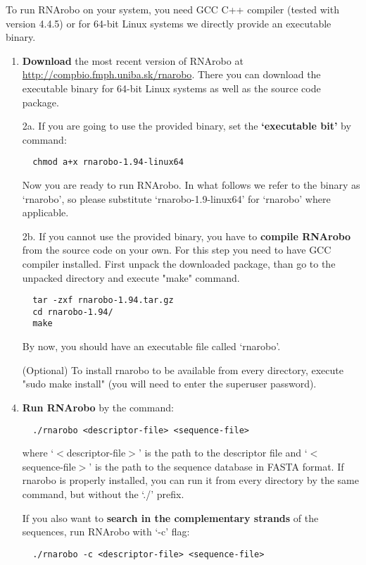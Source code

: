 \documentclass[11pt]{article}
\begin{document}
To run RNArobo on your system, you need GCC C++ compiler (tested with version 4.4.5) or for 64-bit Linux systems we directly provide an executable binary.


\begin{enumerate}
\item \textbf{Download} the most recent version of RNArobo at \url{http://compbio.fmph.uniba.sk/rnarobo}. There you can download the executable binary for 64-bit Linux systems as well as the source code package. 

\item[2a.] If you are going to use the provided binary, set the \textbf{`executable bit'} by command:
\begin{verbatim}
  chmod a+x rnarobo-1.94-linux64
\end{verbatim}
Now you are ready to run RNArobo. In what follows we refer to the binary as `rnarobo', so please substitute `rnarobo-1.9-linux64' for `rnarobo' where applicable.

\pagebreak

\item[2b.] If you cannot use the provided binary, you have to \textbf{compile RNArobo} from the source code on your own. For this step you need to have GCC compiler installed. First unpack the downloaded package, than go to the unpacked directory and execute "make" command.
\begin{verbatim}
  tar -zxf rnarobo-1.94.tar.gz 
  cd rnarobo-1.94/
  make
\end{verbatim}

By now, you should have an executable file called `rnarobo'. 

(Optional) To install rnarobo to be available from every directory, execute "sudo make install" (you will need to enter the superuser password).

\addtocounter{enumi}{1}
\item \textbf{Run RNArobo} by the command:
\begin{verbatim}
  ./rnarobo <descriptor-file> <sequence-file>
\end{verbatim}

where `$<$descriptor-file$>$' is the path to the descriptor file and `$<$sequence-file$>$' is the path to the sequence database in FASTA format. If rnarobo is properly installed, you can run it from every directory by the same command, but without the `./' prefix.

If you also want to \textbf{search in the complementary strands} of the sequences, run RNArobo with `-c' flag: 
\begin{verbatim}
  ./rnarobo -c <descriptor-file> <sequence-file>
\end{verbatim}
\end{enumerate}
\end{document}
